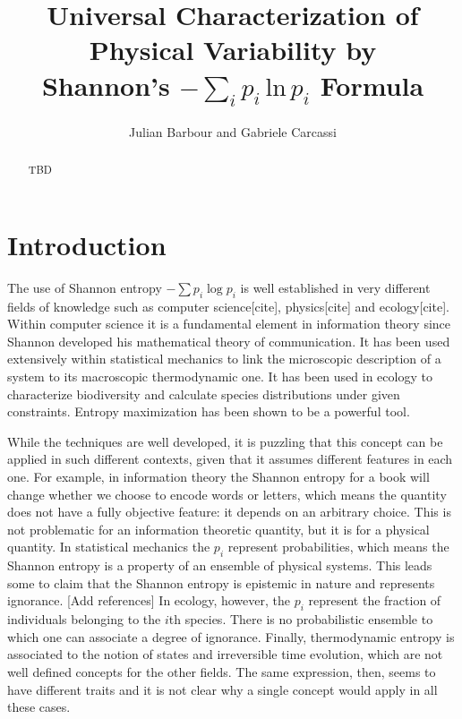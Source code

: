 \documentclass{article}
\title{Universal Characterization of Physical Variability by \\Shannon's $-\sum_ip_i\,\textrm{ln}\,p_i$ Formula}
\author{
	Julian Barbour and 
	Gabriele Carcassi
}
\begin{document}
\maketitle

\tableofcontents

\begin{abstract}
TBD
\end{abstract}




\section{Introduction\label{int}}

The use of Shannon entropy $-\sum p_i \log p_i$ is well established in very different fields of knowledge such as computer science[cite], physics[cite] and ecology[cite]. Within computer science it is a fundamental element in information theory since Shannon developed his mathematical theory of communication. It has been used extensively within statistical mechanics to link the microscopic description of a system to its macroscopic thermodynamic one. It has been used in ecology to characterize biodiversity and calculate species distributions under given constraints. Entropy maximization has been shown to be a powerful tool.

While the techniques are well developed, it is puzzling that this concept can be applied in such different contexts, given that it assumes different features in each one. For example, in information theory the Shannon entropy for a book will change whether we choose to encode words or letters, which means the quantity does not have a fully objective feature: it depends on an arbitrary choice. This is not problematic for an information theoretic quantity, but it is for a physical quantity. In statistical mechanics the $p_i$ represent probabilities, which means the Shannon entropy is a property of an ensemble of physical systems. This leads some to claim that the Shannon entropy is epistemic in nature and represents ignorance. [Add references] In ecology, however, the $p_i$ represent the fraction of individuals belonging to the $i$th species. There is no probabilistic ensemble to which one can associate a degree of ignorance. Finally, thermodynamic entropy is associated to the notion of states and irreversible time evolution, which are not well defined concepts for the other fields. The same expression, then, seems to have different traits and it is not clear why a single concept would apply in all these cases.
\end{document}
